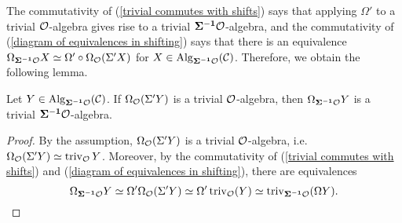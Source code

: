 The commutativity of (\ref{trivial commutes with shifts}) says that applying $\Omega'$ to a trivial ${\mathcal{O}}$-algebra gives rise to a trivial $\bf{\Sigma}^{-1} {\mathcal{O}}$-algebra, and the commutativity of (\ref{diagram of equivalences in shifting}) says that there is an equivalence $\Omega_{\bf{\Sigma}^{-1} {\mathcal{O}}}X \simeq \Omega'\circ \Omega_{{\mathcal{O}}}(\Sigma' X)$ for $X\in \operatorname{Alg}_{\bf{\Sigma}^{-1} {\mathcal{O}}}({\mathcal{C}})$.
Therefore, we obtain the following lemma.
\begin{lemma}
\label{transition of triviality}
Let $Y\in \operatorname{Alg}_{\bf{\Sigma}^{-1} {\mathcal{O}}}({\mathcal{C}})$.
If $\Omega_{{\mathcal{O}}}(\Sigma' Y)$ is a trivial ${\mathcal{O}}$-algebra, then
$\Omega_{\bf{\Sigma}^{-1} {\mathcal{O}}}Y$ is a trivial $\bf{\Sigma}^{-1} {\mathcal{O}}$-algebra.
\end{lemma}
\begin{proof}
    By the assumption, $\Omega_{{\mathcal{O}}}(\Sigma' Y)$ is a trivial ${\mathcal{O}}$-algebra, i.e. $\Omega_{{\mathcal{O}}}(\Sigma' Y)\simeq \operatorname{triv}_{{\mathcal{O}}}Y$.
    Moreover, by the commutativity of (\ref{trivial commutes with shifts}) and (\ref{diagram of equivalences in shifting}), there are equivalences 
    $$
    \Omega_{\bf{\Sigma}^{-1} {\mathcal{O}}}Y \simeq \Omega' \Omega_{{\mathcal{O}}}(\Sigma' Y)
    \simeq 
    \Omega'\operatorname{triv}_{{\mathcal{O}}}(Y)
    \simeq \operatorname{triv}_{\bf{\Sigma}^{-1} {\mathcal{O}}}(\Omega Y).
    $$
\end{proof}

